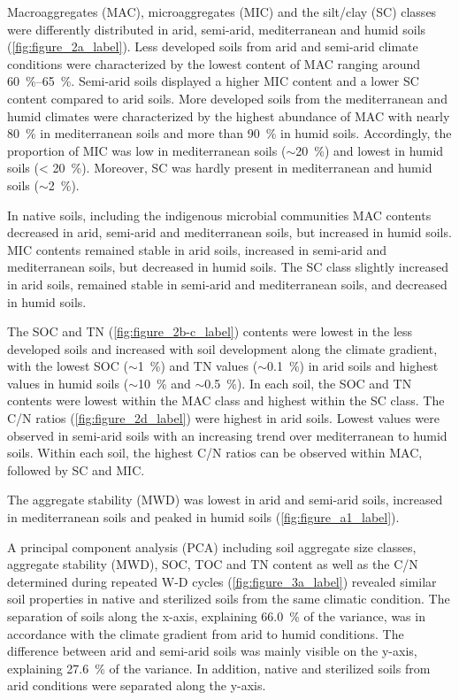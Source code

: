 Macroaggregates (MAC), microaggregates (MIC) and the silt/clay (SC) classes were differently distributed in arid, semi-arid, mediterranean and humid soils (\cref{fig:figure_2a_label}). 
Less developed soils from arid and semi-arid climate conditions were characterized by the lowest content of MAC ranging around \SIrange{60}{65}{\percent}. 
Semi-arid soils displayed a higher MIC content and a lower SC content compared to arid soils. 
More developed soils from the mediterranean and humid climates were characterized by the highest abundance of MAC with nearly \SI{80}{\percent} in mediterranean soils and more than \SI{90}{\percent} in humid soils. 
Accordingly, the proportion of MIC was low in mediterranean soils (\(\sim\)\SI{20}{\percent}) and lowest in humid soils (\SI{< 20}{\percent}). 
Moreover, SC was hardly present in mediterranean and humid soils (\(\sim\)\SI{2}{\percent}).

In native soils, including the indigenous microbial communities MAC contents decreased in arid, semi-arid and mediterranean soils, but increased in humid soils. 
MIC contents remained stable in arid soils, increased in semi-arid and mediterranean soils, but decreased in humid soils. 
The SC class slightly increased in arid soils, remained stable in semi-arid and mediterranean soils, and decreased in humid soils.

The SOC and TN (\cref{fig:figure_2b-c_label}) contents were lowest in the less developed soils and increased with soil development along the climate gradient, with the lowest SOC (\(\sim\)\SI{1}{\percent}) and TN values (\(\sim\)\SI{0.1}{\percent}) in arid soils and highest values in humid soils (\(\sim\)\SI{10}{\percent} and \(\sim\)\SI{0.5}{\percent}). 
In each soil, the SOC and TN contents were lowest within the MAC class and highest within the SC class. 
The C/N ratios (\cref{fig:figure_2d_label}) were highest in arid soils. 
Lowest values were observed in semi-arid soils with an increasing trend over mediterranean to humid soils. 
Within each soil, the highest C/N ratios can be observed within MAC, followed by SC and MIC.

The aggregate stability (MWD) was lowest in arid and semi-arid soils, increased in mediterranean soils and peaked in humid soils (\cref{fig:figure_a1_label}).

A principal component analysis (PCA) including soil aggregate size classes, aggregate stability (MWD), SOC, TOC and TN content as well as the C/N determined during repeated W-D cycles (\cref{fig:figure_3a_label}) revealed similar soil properties in native and sterilized soils from the same climatic condition. 
The separation of soils along the x-axis, explaining \SI{66.0}{\percent} of the variance, was in accordance with the climate gradient from arid to humid conditions. 
The difference between arid and semi-arid soils was mainly visible on the y-axis, explaining \SI{27.6}{\percent} of the variance. 
In addition, native and sterilized soils from arid conditions were separated along the y-axis.


